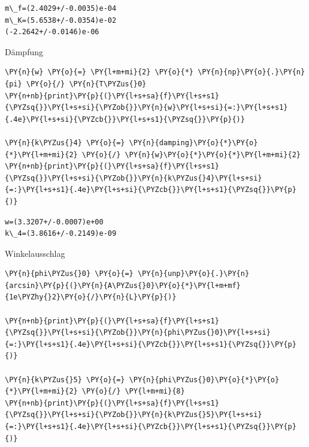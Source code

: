     \begin{Verbatim}[commandchars=\\\{\}]
m\_f=(2.4029+/-0.0035)e-04
m\_K=(5.6538+/-0.0354)e-02
(-2.2642+/-0.0146)e-06
    \end{Verbatim}

    Dämpfung

    \begin{tcolorbox}[breakable, size=fbox, boxrule=1pt, pad at break*=1mm,colback=cellbackground, colframe=cellborder]
\begin{Verbatim}[commandchars=\\\{\}]
\PY{n}{w} \PY{o}{=} \PY{l+m+mi}{2} \PY{o}{*} \PY{n}{np}\PY{o}{.}\PY{n}{pi} \PY{o}{/} \PY{n}{T\PYZus{}0}
\PY{n+nb}{print}\PY{p}{(}\PY{l+s+sa}{f}\PY{l+s+s1}{\PYZsq{}}\PY{l+s+si}{\PYZob{}}\PY{n}{w}\PY{l+s+si}{=:}\PY{l+s+s1}{.4e}\PY{l+s+si}{\PYZcb{}}\PY{l+s+s1}{\PYZsq{}}\PY{p}{)}

\PY{n}{k\PYZus{}4} \PY{o}{=} \PY{n}{damping}\PY{o}{*}\PY{o}{*}\PY{l+m+mi}{2} \PY{o}{/} \PY{n}{w}\PY{o}{*}\PY{o}{*}\PY{l+m+mi}{2}
\PY{n+nb}{print}\PY{p}{(}\PY{l+s+sa}{f}\PY{l+s+s1}{\PYZsq{}}\PY{l+s+si}{\PYZob{}}\PY{n}{k\PYZus{}4}\PY{l+s+si}{=:}\PY{l+s+s1}{.4e}\PY{l+s+si}{\PYZcb{}}\PY{l+s+s1}{\PYZsq{}}\PY{p}{)}
\end{Verbatim}
\end{tcolorbox}

    \begin{Verbatim}[commandchars=\\\{\}]
w=(3.3207+/-0.0007)e+00
k\_4=(3.8616+/-0.2149)e-09
    \end{Verbatim}

    Winkelausschlag

    \begin{tcolorbox}[breakable, size=fbox, boxrule=1pt, pad at break*=1mm,colback=cellbackground, colframe=cellborder]
\begin{Verbatim}[commandchars=\\\{\}]
\PY{n}{phi\PYZus{}0} \PY{o}{=} \PY{n}{unp}\PY{o}{.}\PY{n}{arcsin}\PY{p}{(}\PY{n}{A\PYZus{}0}\PY{o}{*}\PY{l+m+mf}{1e\PYZhy{}2}\PY{o}{/}\PY{n}{L}\PY{p}{)}

\PY{n+nb}{print}\PY{p}{(}\PY{l+s+sa}{f}\PY{l+s+s1}{\PYZsq{}}\PY{l+s+si}{\PYZob{}}\PY{n}{phi\PYZus{}0}\PY{l+s+si}{=:}\PY{l+s+s1}{.4e}\PY{l+s+si}{\PYZcb{}}\PY{l+s+s1}{\PYZsq{}}\PY{p}{)}

\PY{n}{k\PYZus{}5} \PY{o}{=} \PY{n}{phi\PYZus{}0}\PY{o}{*}\PY{o}{*}\PY{l+m+mi}{2} \PY{o}{/} \PY{l+m+mi}{8}
\PY{n+nb}{print}\PY{p}{(}\PY{l+s+sa}{f}\PY{l+s+s1}{\PYZsq{}}\PY{l+s+si}{\PYZob{}}\PY{n}{k\PYZus{}5}\PY{l+s+si}{=:}\PY{l+s+s1}{.4e}\PY{l+s+si}{\PYZcb{}}\PY{l+s+s1}{\PYZsq{}}\PY{p}{)}
\end{Verbatim}
\end{tcolorbox}

